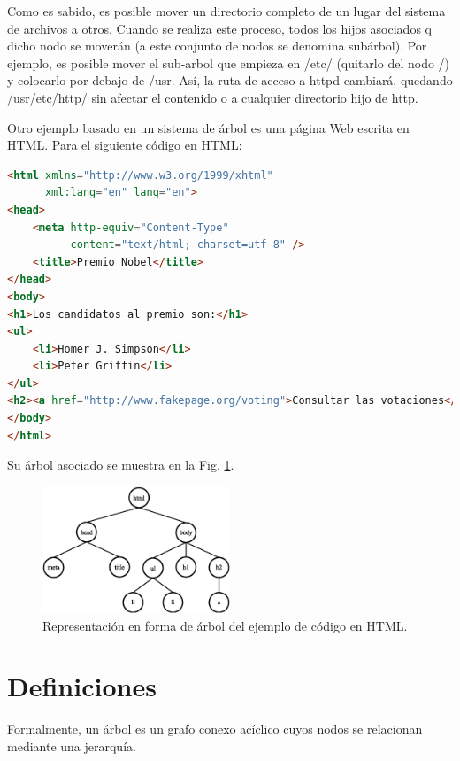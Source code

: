 Como es sabido, es posible mover un directorio completo de un lugar del sistema de archivos a otros. Cuando se realiza este proceso, todos los hijos asociados q dicho nodo se moverán (a este conjunto de nodos se denomina subárbol). Por ejemplo, es posible mover el sub-arbol que empieza en /etc/ (quitarlo del nodo /) y colocarlo por debajo de /usr. Así, la ruta de acceso a httpd cambiará, quedando /usr/etc/http/ sin afectar el contenido o a cualquier directorio hijo de http.

Otro ejemplo basado en un sistema de árbol es una página Web escrita en HTML. Para el siguiente código en HTML:

\begin{lstlisting}[upquote=true, language=html]
<html xmlns="http://www.w3.org/1999/xhtml"
      xml:lang="en" lang="en">
<head>
    <meta http-equiv="Content-Type"
          content="text/html; charset=utf-8" />
    <title>Premio Nobel</title>
</head>
<body>
<h1>Los candidatos al premio son:</h1>
<ul>
    <li>Homer J. Simpson</li>
    <li>Peter Griffin</li>
</ul>
<h2><a href="http://www.fakepage.org/voting">Consultar las votaciones</a><h2>
</body>
</html>
\end{lstlisting}

Su árbol asociado se muestra en la Fig. \ref{fig:treeHTML}.

\begin{figure}[htpb!]
  \begin{center}
    \includegraphics[width=0.5\textwidth]{images/treeHTML.eps}
  \end{center}
  \caption{Representación en forma de árbol del ejemplo de código en HTML.}
  \label{fig:treeHTML}
\end{figure}

\section{Definiciones} \label{lb:deftree}

Formalmente, un árbol es un grafo conexo acíclico cuyos nodos se relacionan mediante una jerarquía.

